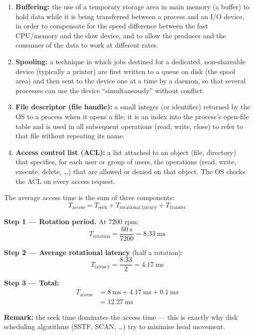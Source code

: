 \documentclass[11pt]{article}
\newcommand{\cle}[1]{{\popxbold\color{popdark}#1}}
\begin{document}
\begin{corrige}
\begin{enumerate}
\item \textbf{Buffering:} the use of a temporary storage area in main memory (a \cle{buffer}) to hold data while it is being transferred between a process and an I/O device, in order to compensate for the speed difference between the fast CPU/memory and the slow device, and to allow the producer and the consumer of the data to work at different rates.
\item \textbf{Spooling:} a technique in which jobs destined for a dedicated, non-shareable device (typically a printer) are first written to a queue on disk (the spool area) and then sent to the device one at a time by a daemon, so that several processes can use the device ``simultaneously'' without conflict.
\item \textbf{File descriptor (file handle):} a small integer (or identifier) returned by the OS to a process when it opens a file; it is an index into the process's open-file table and is used in all subsequent operations (read, write, close) to refer to that file without repeating its name.
\item \textbf{Access control list (ACL):} a list attached to an object (file, directory) that specifies, for each user or group of users, the operations (read, write, execute, delete, \dots) that are allowed or denied on that object. The OS checks the ACL on every access request.
\end{enumerate}
\end{corrige}

\begin{corrige}
The average access time is the sum of three components:
\[ T_{\text{access}} = T_{\text{seek}} + T_{\text{rotational latency}} + T_{\text{transfer}} \]

\textbf{Step 1 — Rotation period.} At 7200 rpm:
\[ T_{\text{rotation}} = \frac{60\ \mathrm{s}}{7200} = 8.33\ \mathrm{ms} \]

\textbf{Step 2 — Average rotational latency} (half a rotation):
\[ T_{\text{latency}} = \frac{8.33}{2} = 4.17\ \mathrm{ms} \]

\textbf{Step 3 — Total:}
\begin{align*}
T_{\text{access}} &= 8\ \mathrm{ms} + 4.17\ \mathrm{ms} + 0.1\ \mathrm{ms} \\
&= \boxed{12.27\ \mathrm{ms}}
\end{align*}

\textbf{Remark:} the seek time dominates the access time — this is exactly why disk scheduling algorithms (SSTF, SCAN, \dots) try to minimise head movement.
\end{corrige}
\end{document}
